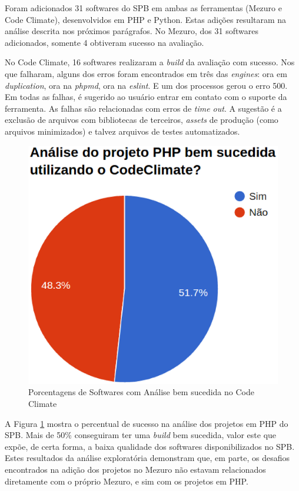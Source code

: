 Foram adicionados 31 softwares do SPB em ambas as ferramentas (Mezuro e
Code Climate), desenvolvidos em PHP e Python. Estas adições resultaram na
análise descrita nos próximos parágrafos.
No Mezuro, dos 31 softwares adicionados, somente 4 obtiveram sucesso na
avaliação.

No Code Climate, 16 softwares realizaram a \textit{build} da avaliação com
sucesso. Nos que falharam, alguns dos erros foram encontrados em três das
\textit{engines}: ora em \textit{duplication}, ora na \textit{phpmd}, ora na
\textit{eslint}. E um dos processos gerou o erro 500. Em todas as falhas, é
sugerido ao usuário entrar em contato com o suporte da ferramenta. As falhas
são relacionadas com erros de \textit{time out}. A sugestão é a exclusão de
arquivos com bibliotecas de terceiros, \textit{assets} de produção (como
arquivos minimizados) e talvez arquivos de testes automatizados.

\begin{figure}[!htb]
	\centering
    \includegraphics[keepaspectratio=true,scale=0.6]
    {figuras/is_codeclimate_php_success.eps}
  \caption{Porcentagens de Softwares com Análise bem sucedida no Code Climate}
  \label{fig:is_codeclimate_php_success}
\end{figure}

A Figura \ref{fig:is_codeclimate_php_success} mostra o percentual de sucesso na
análise dos projetos em PHP do SPB. Mais de 50\% conseguiram ter uma
\textit{build} bem sucedida, valor este que expõe, de certa forma, a baixa
qualidade dos softwares disponibilizados no SPB. Estes resultados da análise
exploratória demonstram que, em parte, os desafios encontrados na adição dos
projetos no Mezuro não estavam relacionados diretamente com o próprio Mezuro, e
sim com os projetos em PHP.


